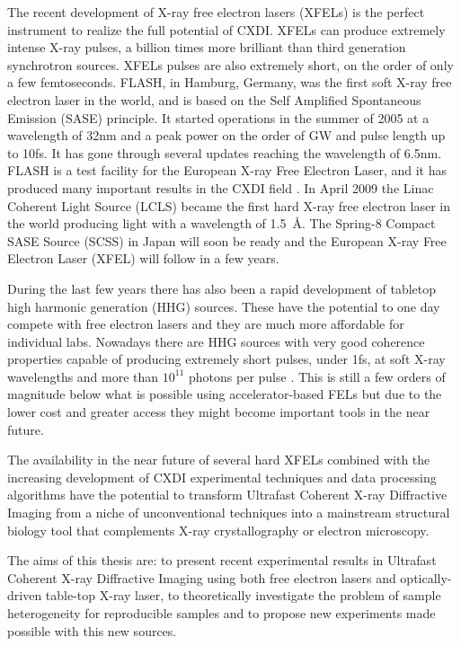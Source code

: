 The recent development of X-ray free electron lasers (XFELs) is the perfect
instrument to realize the full potential of CXDI. XFELs can produce extremely
intense X-ray pulses, a billion times more brilliant than third
generation synchrotron sources. XFELs pulses are also extremely short, on the order of
only a few femtoseconds. FLASH, in Hamburg, Germany, was the first soft X-ray
free electron laser in the world, and is based on the Self Amplified Spontaneous
Emission (SASE) principle. It started operations in the summer of 2005 at
a wavelength of 32nm and a peak power on the order of GW and pulse length up to
10fs. It has gone through several updates reaching the wavelength of
6.5nm. FLASH is a test facility for the European X-ray Free Electron
Laser, and it has produced many important results in the CXDI field \cite{Chapman2006Femtosecond,Chapman2007Femtosecond}. In April 2009 the Linac Coherent Light Source (LCLS)
became the first hard X-ray free electron laser in the world producing light
with a wavelength of \mbox{1.5 \AA}. The Spring-8 Compact SASE Source (SCSS) in
Japan will soon be ready and the European X-ray Free Electron Laser (XFEL)
will follow in a few years.

During the last few years there has also been a rapid development of tabletop
high harmonic generation (HHG) sources. These have the potential to one day
compete with free electron lasers and they are much more affordable for
individual labs. Nowadays there are HHG sources with very good coherence
properties capable of producing extremely short pulses, under 1fs, at soft X-ray wavelengths and more than $10^{11}$ photons
per pulse \cite{Ravasio2009SingleShot}. This is still a few orders of magnitude below what is
possible using accelerator-based FELs but due to the lower cost and greater access they might
become important tools in the near future.

The availability in the near future of several hard XFELs combined with the
increasing development of CXDI experimental techniques and data processing
algorithms have the potential to transform Ultrafast Coherent X-ray Diffractive
Imaging from a niche of unconventional techniques into a mainstream structural
biology tool that complements X-ray crystallography or electron microscopy.


The aims of this thesis are: to present recent experimental results in Ultrafast
Coherent X-ray Diffractive Imaging using both free electron lasers and
optically-driven table-top X-ray laser, to theoretically investigate the problem of sample heterogeneity
for reproducible samples and to propose new experiments made possible with this
new sources.
